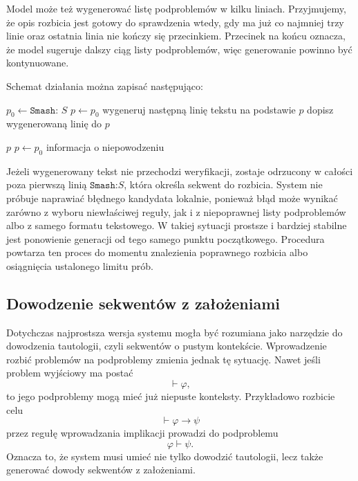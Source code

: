 \documentclass[shortabstract]{iithesis}
\theoremstyle{definition}
\theoremstyle{remark}
\theoremstyle{plain}
\begin{document}
Model może też wygenerować listę podproblemów w kilku liniach. Przyjmujemy, że opis
rozbicia jest gotowy do sprawdzenia wtedy, gdy ma już co najmniej trzy linie oraz
ostatnia linia nie kończy się przecinkiem. Przecinek na końcu oznacza, że model
sugeruje dalszy ciąg listy podproblemów, więc generowanie powinno być kontynuowane.

Schemat działania można zapisać następująco:

\begin{algorithm}[H]
\caption{Generowanie rozbicia}
\begin{algorithmic}[1]
    \State \(p_0 \gets \texttt{Smash: } S\)
    \State \(p \gets p_0\)
            \State wygeneruj następną linię tekstu na podstawie \(p\)
            \State dopisz wygenerowaną linię do \(p\)
        \EndWhile

            \State \Return \(p\)
        \Else
            \State \(p \gets p_0\)
        \EndIf
    \EndFor
    \State \Return informacja o niepowodzeniu
\EndProcedure
\end{algorithmic}
\end{algorithm}

Jeżeli wygenerowany tekst nie przechodzi weryfikacji, zostaje odrzucony w całości
poza pierwszą linią \(\texttt{Smash:} S\), która określa sekwent do rozbicia. System nie
próbuje naprawiać błędnego kandydata lokalnie, ponieważ błąd może wynikać zarówno
z wyboru niewłaściwej reguły, jak i z niepoprawnej listy podproblemów albo z samego
formatu tekstowego. W takiej sytuacji prostsze i bardziej stabilne jest ponowienie
generacji od tego samego punktu początkowego. Procedura powtarza ten proces do
momentu znalezienia poprawnego rozbicia albo osiągnięcia ustalonego limitu prób.



\subsection{Dowodzenie sekwentów z założeniami}

Dotychczas najprostsza wersja systemu mogła być rozumiana jako narzędzie do
dowodzenia tautologii, czyli sekwentów o pustym kontekście. Wprowadzenie rozbić
problemów na podproblemy zmienia jednak tę sytuację. Nawet jeśli problem wyjściowy
ma postać
\[
    \vdash \varphi,
\]
to jego podproblemy mogą mieć już niepuste konteksty. Przykładowo rozbicie celu
\[
    \vdash \varphi \to \psi
\]
przez regułę wprowadzania implikacji prowadzi do podproblemu
\[
    \varphi \vdash \psi.
\]
Oznacza to, że system musi umieć nie tylko dowodzić tautologii, lecz także generować
dowody sekwentów z założeniami.
\end{document}
